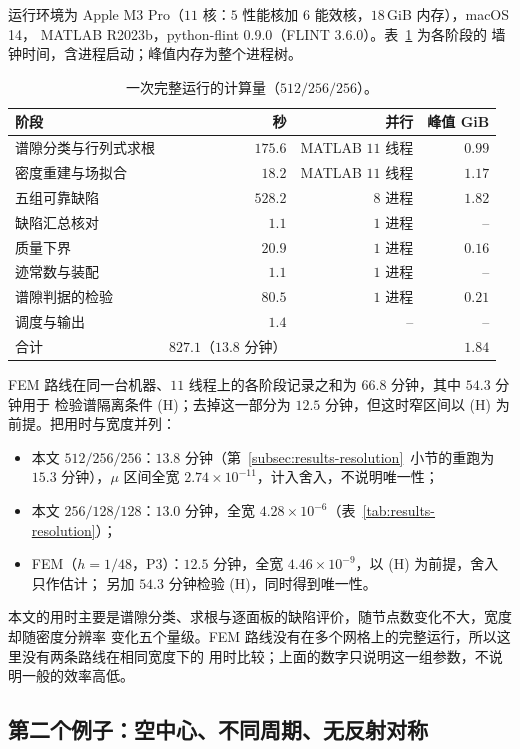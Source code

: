 运行环境为 Apple M3 Pro（$11$ 核：$5$ 性能核加 $6$ 能效核，$18$\,GiB 内存），macOS 14，
MATLAB R2023b，python-flint 0.9.0（FLINT 3.6.0）。表~\ref{tab:results-cost} 为各阶段的
墙钟时间，含进程启动；峰值内存为整个进程树。
\begin{table}[htbp]
  \centering
  \caption{一次完整运行的计算量（$512/256/256$）。}
  \label{tab:results-cost}
  \begin{tabular}{lrrr}
    \toprule
    阶段 & 秒 & 并行 & 峰值 GiB\\
    \midrule
    谱隙分类与行列式求根 & $175.6$ & MATLAB $11$ 线程 & $0.99$\\
    密度重建与场拟合 & $18.2$ & MATLAB $11$ 线程 & $1.17$\\
    五组可靠缺陷 & $528.2$ & $8$ 进程 & $1.82$\\
    缺陷汇总核对 & $1.1$ & $1$ 进程 & --\\
    质量下界 & $20.9$ & $1$ 进程 & $0.16$\\
    迹常数与装配 & $1.1$ & $1$ 进程 & --\\
    谱隙判据的检验 & $80.5$ & $1$ 进程 & $0.21$\\
    调度与输出 & $1.4$ & -- & --\\
    \midrule
    合计 & $827.1$（$13.8$ 分钟） & & $1.84$\\
    \bottomrule
  \end{tabular}
\end{table}
FEM 路线在同一台机器、$11$ 线程上的各阶段记录之和为 $66.8$ 分钟，其中 $54.3$ 分钟用于
检验谱隔离条件 (H)；去掉这一部分为 $12.5$ 分钟，但这时窄区间以 (H) 为前提。把用时与宽度并列：
\begin{itemize}
  \item 本文 $512/256/256$：$13.8$ 分钟（第~\ref{subsec:results-resolution}~小节的重跑为 $15.3$ 分钟），$\mu$ 区间全宽 $2.74\times10^{-11}$，计入舍入，不说明唯一性；
  \item 本文 $256/128/128$：$13.0$ 分钟，全宽 $4.28\times10^{-6}$（表~\ref{tab:results-resolution}）；
  \item FEM（$h=1/48$，P3）：$12.5$ 分钟，全宽 $4.46\times10^{-9}$，以 (H) 为前提，舍入只作估计；
    另加 $54.3$ 分钟检验 (H)，同时得到唯一性。
\end{itemize}
本文的用时主要是谱隙分类、求根与逐面板的缺陷评价，随节点数变化不大，宽度却随密度分辨率
变化五个量级。FEM 路线没有在多个网格上的完整运行，所以这里没有两条路线在相同宽度下的
用时比较；上面的数字只说明这一组参数，不说明一般的效率高低。

\subsection{第二个例子：空中心、不同周期、无反射对称}
\label{subsec:results-example2}

